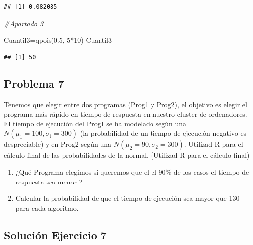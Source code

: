 \documentclass[
]{article}
\newenvironment{Shaded}{\begin{snugshade}}{\end{snugshade}}
\newcommand{\CommentTok}[1]{\textcolor[rgb]{0.56,0.35,0.01}{\textit{#1}}}
\newcommand{\DecValTok}[1]{\textcolor[rgb]{0.00,0.00,0.81}{#1}}
\newcommand{\FloatTok}[1]{\textcolor[rgb]{0.00,0.00,0.81}{#1}}
\newcommand{\FunctionTok}[1]{\textcolor[rgb]{0.00,0.00,0.00}{#1}}
\newcommand{\NormalTok}[1]{#1}
\newcommand{\OtherTok}[1]{\textcolor[rgb]{0.56,0.35,0.01}{#1}}
\newcommand{\SpecialCharTok}[1]{\textcolor[rgb]{0.00,0.00,0.00}{#1}}
\providecommand{\tightlist}{%
  \setlength{\itemsep}{0pt}\setlength{\parskip}{0pt}}
\begin{document}
\begin{verbatim}
## [1] 0.082085
\end{verbatim}

\begin{Shaded}
\begin{Highlighting}[]
\CommentTok{\#Apartado 3}

\NormalTok{Cuantil3}\OtherTok{=}\FunctionTok{qpois}\NormalTok{(}\FloatTok{0.5}\NormalTok{, }\DecValTok{5}\SpecialCharTok{*}\DecValTok{10}\NormalTok{)}
\NormalTok{Cuantil3}
\end{Highlighting}
\end{Shaded}

\begin{verbatim}
## [1] 50
\end{verbatim}

\hypertarget{problema-7}{%
\subsection{Problema 7}\label{problema-7}}

Tenemos que elegir entre dos programas (Prog1 y Prog2), el objetivo es
elegir el programa más rápido en tiempo de respuesta en nuestro cluster
de ordenadores. El tiempo de ejecución del Prog1 se ha modelado según
una \(N(\mu_1=100, \sigma_1=300)\) (la probabilidad de un tiempo de
ejecución negativo es despreciable) y en Prog2 según una
\(N(\mu_2=90, \sigma_2=300)\). Utilizad R para el cálculo final de las
probabilidades de la normal. (Utilizad R para el cálculo final)

\begin{enumerate}
\def\labelenumi{\arabic{enumi}.}
\tightlist
\item
  ¿Qué Programa elegimos si queremos que el el 90\% de los casos el
  tiempo de respuesta sea menor ?
\item
  Calcular la probabilidad de que el tiempo de ejecución sea mayor que
  130 para cada algoritmo.
\end{enumerate}

\hypertarget{soluciuxf3n-ejercicio-7}{%
\subsection{Solución Ejercicio 7}\label{soluciuxf3n-ejercicio-7}}
\end{document}
